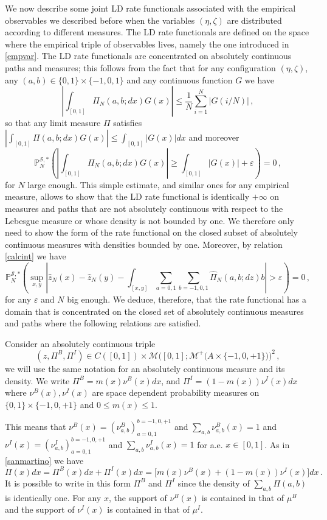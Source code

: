 \documentclass[reqno]{amsart}
\theoremstyle{plain}
\theoremstyle{definition}
\theoremstyle{remark}
\numberwithin{equation}{section}
\numberwithin{theorem}{section}
\renewcommand{\epsilon}{\varepsilon}
\renewcommand{\hat}{\widehat}
\newcommand{\<}{\langle}
\renewcommand{\>}{\rangle}
\begin{document}
	
	We now describe some joint LD rate functionals associated with the empirical observables we described before when the variables $(\eta,\zeta)$ are distributed according to different measures. The LD rate functionals are defined on the space where the empirical triple of observables lives, namely the one introduced in \eqref{empvar}. The LD rate functionals are concentrated on absolutely continuous paths and measures; this follows from the fact that for any configuration $(\eta,\zeta)$, any $(a,b)\in \{0,1\}\times \{-1,0,1\}$ and any continuous function $G$ we have
	$$
	\left|\int_{[0,1]} \Pi_N(a,b;dx)G(x)\right|\leq \frac{1}{N}\sum_{i=1}^N\left|G(i/N)\right|\,,
	$$
	so that any limit measure $\Pi$ satisfies $\left|\int_{[0,1]} \Pi(a,b;dx)G(x)\right|\leq \int_{[0,1]}\left|G(x)\right|dx$ and moreover
	$$
	\mathbb P^{\mathcal S,*}_N\left(\left|\int_{[0,1]} \Pi_N(a,b;dx)G(x)\right|\geq \int_{[0,1]}\left|G(x)\right|+\epsilon\right)=0\,,
	$$
	for $N$ large enough.
	This simple estimate, and similar ones for any empirical measure, allows to show that the LD rate functional is identically $+\infty$ on measures and paths that are not absolutely continuous with respect to the Lebesgue measure or whose density is not bounded by one. We therefore only need to show the form of the rate functional on the closed subset of absolutely continuous measures with densities bounded by one. Moreover, by relation \eqref{calcint} we have
	\begin{equation}\label{pace}
		\mathbb P^{\mathcal S,*}_N\left(\sup_{x,y}\left|\hat z_N\left(x\right)-\hat z_N\left(y\right)-\int_{[x,y]}\sum_{a=0,1}\sum_{ b=-1,0,1}\hat{\Pi}_N(a,b; dz)b\right|>\epsilon\right)=0\,, 
	\end{equation}
	for any $\epsilon$ and $N$ big enough.
	We deduce, therefore, that the rate functional has a domain that is concentrated on the closed set of absolutely continuous measures and paths where the following relations are satisfied.
	
	\smallskip
	
	Consider an absolutely continuous triple 
	$$\left(z, \Pi^B,\Pi^I\right)\in C([0,1])\times\mathcal M\Big([0,1]; \mathcal M^+\big(A\times\{-1,0,+1\}\big)\Big)^2\,,$$
	we will use the same notation for an absolutely continuous measure and its density.
	We write $\Pi^B= m(x)\nu^B (x)dx$, and $\Pi^I= (1-m(x))\nu^I (x)dx$  where $\nu^B(x), \nu^I(x)$ are space dependent probability measures on $\{0,1\}\times \{-1,0,+1\}$ and $0\leq m(x)\leq 1$. 
	
	This means that $\nu^B(x)=\left(\nu^B_{a, b}\right)_{a=0,1}^{ b=-1,0,+1}$ and $\sum_{a,b}\nu^B_{a,b}(x)=1$ and $\nu^I(x)=\left(\nu^I_{a, b}\right)_{a=0,1}^{ b=-1,0,+1}$ and $\sum_{a, b}\nu^I_{a, b}(x)=1$ for a.e. $x\in[0,1]$. 
	As in \eqref{sanmartino} we have 
	$$\Pi(x)dx=\Pi^B(x)dx+\Pi^I(x)dx=\big[m(x)\nu^B (x)+(1-m(x))\nu^I (x)\big]dx\,.$$ 
	It is possible to write in this form $\Pi^B$ and $\Pi^I$ since the density of $\sum_{a,b}\Pi(a,b)$ is identically one. For any $x$, the support of $\nu^B(x)$ is contained in that of $\mu^B$ and the support of $\nu^I(x)$ is contained in that of $\mu^I$. 
	
\end{document}
